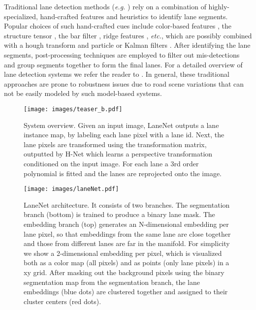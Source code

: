 \documentclass[letterpaper, 10 pt, conference]{ieeeconf}
\newcommand{\eg}{\textit{e.g. }}
\newcommand{\etc}{\textit{etc.}}
\begin{document}
Traditional lane detection methods (\eg \cite{Borkar12,Deusch12,Hur13,Jung13,Tan14,Wu14}) rely on a combination of highly-specialized, hand-crafted features and heuristics to identify lane segments.
Popular choices of such hand-crafted cues include color-based features \cite{Chiu05}, the structure tensor \cite{Loose09}, the bar filter \cite{Teng10}, ridge features \cite{Lopez10}, \etc, which are possibly combined with a hough transform \cite{Liu10,Zhou10} and particle or Kalman filters \cite{Kim08,Danescu09,Teng10}.
After identifying the lane segments, post-processing techniques are employed to filter out mis-detections and group segments together to form the final lanes.
For a detailed overview of lane detection systems we refer the reader to \cite{Bar14}.
In general, these traditional approaches are
prone to robustness issues due to road scene variations that can not be easily modeled by such model-based systems.

\begin{figure}[t]
	\begin{center}
		\texttt{[image: images/teaser\_b.pdf]}
	\end{center}
	\caption{System overview. Given an input image, LaneNet outputs a lane instance map, by labeling each lane pixel with a lane id. Next, the lane pixels are transformed using the transformation matrix, outputted by H-Net which learns a perspective transformation conditioned on the input image. For each lane a 3rd order polynomial is fitted and the lanes are reprojected onto the image. }
	\label{fig:laneNet_teaser}
\end{figure}

\begin{figure*}[t]
	\begin{center}
		\texttt{[image: images/laneNet.pdf]}
	\end{center}
	\caption{LaneNet architecture. It consists of two branches. The segmentation branch (bottom) is trained to produce a binary lane mask. The embedding branch (top) generates an N-dimensional embedding per lane pixel, so that embeddings from the same lane are close together and those from different lanes are far in the manifold. For simplicity we show a 2-dimensional embedding per pixel, which is visualized both as a color map (all pixels) and as points (only lane pixels) in a xy grid. After masking out the background pixels using the binary segmentation map from the segmentation branch, the lane embeddings (blue dots) are clustered together and assigned to their cluster centers (red dots).}
	\label{fig:laneNet}
\end{figure*}
\end{document}
